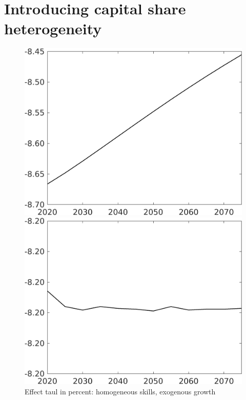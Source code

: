 \documentclass[12pt]{article}
\begin{document}
\clearpage \newpage
\section{Introducing capital share heterogeneity}


\begin{figure}[h!!]
	\centering
	\caption{Effect taul in percent: homogeneous skills, exogenous growth }\label{fig:LF_BAU_nsk1_xgr1}
	\begin{minipage}[]{0.32\textwidth}
		\includegraphics[width=1\textwidth]{../../codding_model/own_basedOnFried/optimalPol_010922_revision/figures/all_13Sept22/CompTaul_LFBAUPer_Reg0_Emnet_spillover0_nsk1_xgr1_knspil0_sep1_countec0_GovRev0_etaa0.79.png}
	\end{minipage}	
	\begin{minipage}[]{0.32\textwidth}
		\includegraphics[width=1\textwidth]{../../codding_model/own_basedOnFried/optimalPol_010922_revision/figures/all_13Sept22/CompTaul_LFBAUPer_Reg0_hh_spillover0_nsk1_xgr1_knspil0_sep1_countec0_GovRev0_etaa0.79.png}

\end{minipage}
\end{figure}
\end{document}
